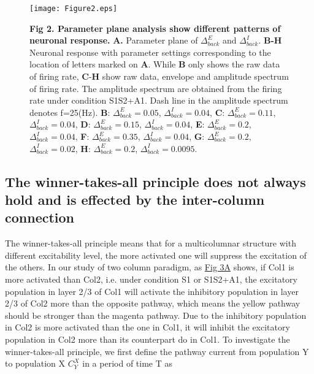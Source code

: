 \documentclass[10pt,letterpaper]{article}
\begin{document}
\begin{figure}[!h]
\begin{adjustwidth}{-2in}{0.3in} %
\centering
\texttt{[image: Figure2.eps]}
\begin{flushleft} {\bf Fig 2. Parameter plane analysis show different patterns of neuronal response.}
\textbf{A.} Parameter plane of $\Delta_{back}^{E}$ and $\Delta_{back}^{I}$. \textbf{B-H} Neuronal response with parameter settings corresponding to the location of letters marked on \textbf{A}. While \textbf{B} only shows the raw data of firing rate, \textbf{C}-\textbf{H} show raw data, envelope and amplitude spectrum of firing rate. The amplitude spectrum are obtained from the firing rate under condition S1S2+A1. Dash line in the amplitude spectrum denotes f=25(Hz). \textbf{B}: $\Delta_{back}^{E}=0.05$, $\Delta_{back}^{I}=0.04$, \textbf{C}: $\Delta_{back}^{E}=0.11$, $\Delta_{back}^{I}=0.04$, \textbf{D}: $\Delta_{back}^{E}=0.15$, $\Delta_{back}^{I}=0.04$, \textbf{E}: $\Delta_{back}^{E}=0.2$, $\Delta_{back}^{I}=0.04$, \textbf{F}: $\Delta_{back}^{E}=0.35$, $\Delta_{back}^{I}=0.04$, \textbf{G}: $\Delta_{back}^{E}=0.2$, $\Delta_{back}^{I}=0.02$, \textbf{H}: $\Delta_{back}^{E}=0.2$, $\Delta_{back}^{I}=0.0095$. 
\end{flushleft}
\hypertarget{fig:fig2}{}
\end{adjustwidth}
\end{figure}

\subsection*{The winner-takes-all principle does not always hold and is effected by the inter-column connection}
The winner-takes-all principle means that for a multicolumnar structure with different excitability level, the more activated one will suppress the excitation of the others. In our study of two column paradigm, as \hyperlink{fig:fig3}{Fig 3A} shows, if Col1 is more activated than Col2, i.e. under condition S1 or S1S2+A1, the excitatory population in layer 2/3 of Col1 will activate the inhibitory population in layer 2/3 of Col2 more than the opposite pathway, which means the yellow pathway should be stronger than the magenta pathway. Due to the inhibitory population in Col2 is more activated than the one in Col1, it will inhibit the excitatory population in Col2 more than its counterpart do in Col1.
To investigate the winner-takes-all principle, we first define the pathway current from population Y to population X $C_{Y}^{X}$ in a period of time T as
\end{document}
